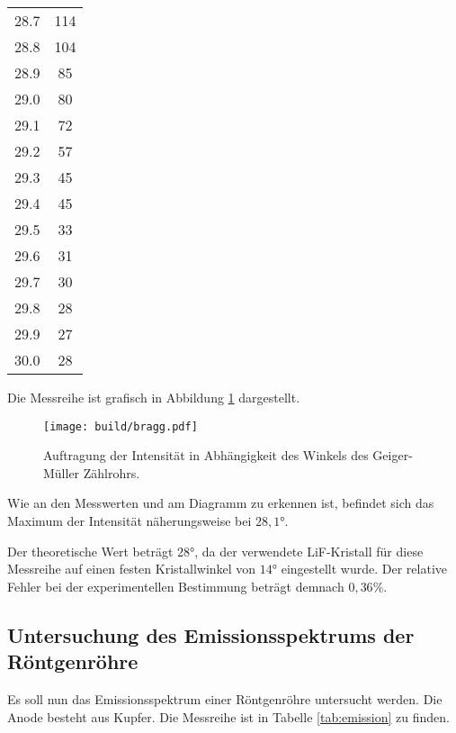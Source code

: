 \begin{table}[htp]
\begin{center}
\begin{tabular}{S[table-format=2.1] S[table-format=3.0]}
                        28.7 & 114\\
                        28.8 & 104\\
                        28.9 & 85\\
                        29.0 & 80\\
                        29.1 & 72\\
                        29.2 & 57\\
                        29.3 & 45\\
                        29.4 & 45\\
                        29.5 & 33\\
                        29.6 & 31\\
                        29.7 & 30\\
                        29.8 & 28\\
                        29.9 & 27\\
                        30.0 & 28\\
                \bottomrule
                \end{tabular}
        \end{center}
\end{table}

Die Messreihe ist grafisch in Abbildung \ref{fig:bragg} dargestellt.

\begin{figure}
  \centering
  \texttt{[image: build/bragg.pdf]}
  \caption{Auftragung der Intensität in Abhängigkeit des Winkels des Geiger-Müller Zählrohrs.}
  \label{fig:bragg}
\end{figure}

Wie an den Messwerten und am Diagramm zu erkennen ist, befindet sich das Maximum
der Intensität näherungsweise bei $28{,}1°$.

Der theoretische Wert beträgt $28°$, da der verwendete LiF-Kristall für diese Messreihe
auf einen festen Kristallwinkel von $14°$ eingestellt wurde. Der relative Fehler bei
der experimentellen Bestimmung beträgt demnach $0{,}36\%$.

\subsection{Untersuchung des Emissionsspektrums der Röntgenröhre}
\label{subsec:emission}

Es soll nun das Emissionsspektrum einer Röntgenröhre untersucht werden. Die Anode besteht aus
Kupfer. Die Messreihe ist in Tabelle \ref{tab:emission} zu finden.

